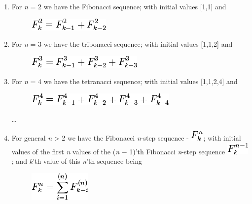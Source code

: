 \begin{enumerate}
\item
  For \emph{n} = 2 we have the Fibonacci sequence; with initial values
  {[}1,1{]} and
  \begin{figure}[H]
    \centering
    \includegraphics[scale=.6]{graphics/ea8fba6081e51a2e4f0cd0d58c3c7032.png}    
  \end{figure}
\item
  For \emph{n} = 3 we have the tribonacci sequence; with initial values
  {[}1,1,2{]} and
  \begin{figure}[H]
    \centering
     \includegraphics[scale=.6]{graphics/a96e7fe6a7eb7371ab85f6a135b84056.png}    
  \end{figure}
\item
  For \emph{n} = 4 we have the tetranacci sequence; with initial values
  {[}1,1,2,4{]} and
  \begin{figure}[H]
    \centering
    \includegraphics[scale=.6]{graphics/ea2b3ddffa2a578dbe5d923abd914aa5.png}
  \end{figure}

\ldots{}    

\item
  For general \emph{n} \textgreater{} 2 we have the Fibonacci
  \emph{n}-step sequence -
  \includegraphics[scale=.6]{graphics/f6e22469b4396d8fa34e202e5c716abc.png};
  with initial values of the first \emph{n} values of the (\emph{n} −
  1)'th Fibonacci \emph{n}-step sequence
  \includegraphics[scale=.6]{graphics/79293ba1053dbc3f23c579b2e8141034.png};
  and \emph{k}'th value of this \emph{n}'th sequence being

  \begin{figure}[H]
    \centering
     \includegraphics[scale=.6]{graphics/c53daded435e185afefbac417fef75e7.png}    
  \end{figure}
\end{enumerate}

